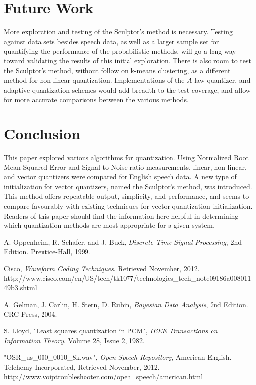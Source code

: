 \documentclass[journal]{IEEEtran}
\begin{document}
\section{Future Work}
More exploration and testing of the Sculptor's method is necessary. Testing against data sets besides speech data, as well as a larger sample set for
quantifying the performance of the probabilistic methods, will go a long way toward validating the results of this initial exploration. There is also 
room to test the Sculptor's method, without follow on k-means clustering, as a different method for non-linear quantization. Implementations of the 
$A$-law quantizer, and adaptive quantization schemes would add breadth to the test coverage, and allow for more accurate comparisons between the 
various methods.

\section{Conclusion}
This paper explored various algorithms for quantization. Using Normalized Root Mean Squared Error and Signal to Noise ratio measurements, 
linear, non-linear, and vector quantizers were compared for English speech data. A new type of initialization for vector quantizers, named
the Sculptor's method, was introduced. This method offers repeatable output, simplicity, and performance, and seems to compare favourably with 
existing techniques for vector quantization initialization. Readers of this paper should find the information here helpful in determining which
quantization methods are most appropriate for a given system.

\begin{thebibliography}{1}
A. Oppenheim, R. Schafer, and J. Buck, \emph{Discrete Time Signal Processing}, 2nd Edition. Prentice-Hall, 1999.

Cisco, \emph{Waveform Coding Techniques}. Retrieved November, 2012. http://www.cisco.com/en/US/tech/tk1077/technologies\_tech\_note09186a00801149b3.shtml 

A. Gelman, J. Carlin, H. Stern, D. Rubin, \emph{Bayesian Data Analysis}, 2nd Edition. CRC Press, 2004.

S. Lloyd, "Least squares quantization in PCM", \emph{IEEE Transactions on Information Theory}. Volume 28, Issue 2, 1982.

"OSR\_us\_000\_0010\_8k.wav", \emph{Open Speech Repository}, American English. Telchemy Incorporated, Retrieved November, 2012.  
http://www.voiptroubleshooter.com/open\_speech/american.html 
\end{thebibliography}
\end{document}
